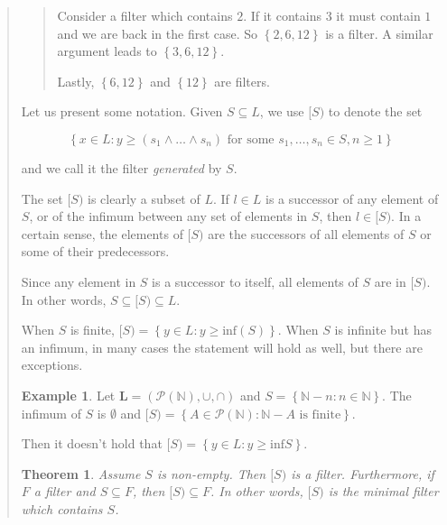 \documentclass[a4paper, 12pt]{article}
\newtheorem{theorem}{Theorem}
\theoremstyle{definition}
\theoremstyle{definition}
\newtheorem{example}{Example}
\theoremstyle{definition}
\begin{document}
\begin{quote}
\begin{quote}
Consider a filter which contains $2$. If it contains $3$ it must contain $1$
and we are back in the first case. So $\left\{ 2, 6, 12 \right\} $ is a filter.
A similar argument leads to $\left\{ 3, 6, 12 \right\} $.

Lastly, $\left\{ 6, 12 \right\} $ and $\left\{ 12 \right\} $ are filters.

\end{quote}
\normalsize

Let us present some notation. Given $S \subseteq L$, we use $[S)$ to 
denote the set 

\begin{equation*}
    \left\{ x \in L : y \geq (s_1 \land  \ldots \land s_n) \text{ for some } s_1, \ldots, s_n \in S, n \geq 1 \right\} 
\end{equation*}

and we call it the filter \textit{generated} by $S$.

The set $[S)$ is clearly a subset of $L$. If $l \in L$ is a successor of any
element of $S$, or of the infimum between any set of elements in $S$, then $l
\in [S)$. In a certain sense, the elements of $[S)$ are the successors of all
elements of $S$ or some of their predecessors.

Since any element in $S$ is a successor to itself, all elements of $S$ are in
$[S)$. In other words, $S \subseteq [S) \subseteq L$.

When $S$ is finite, $[S) = \left\{ y \in L : y \geq \text{inf}(S) \right\} $.
When $S$ is infinite but has an infimum, in many cases the statement will hold
as well, but there are exceptions.

\begin{example}
    Let $\textbf{L} = \left( \mathcal{P}(\mathbb{N}), \cup, \cap  \right) $ and 
    $S = \left\{ \mathbb{N} - n : n \in \mathbb{N} \right\} $. 
    The infimum of $S$ is $\emptyset$ and $[S) = \left\{ A \in
    \mathcal{P}(\mathbb{N}) : \mathbb{N} - A \text{ is finite}\right\} $.

    Then it doesn't hold that $[S) = \left\{ y \in L : y \geq \text{inf} S
    \right\} $.
\end{example}

\begin{theorem}
    Assume $S$ is non-empty. Then $[S)$ is a filter. Furthermore, if $F$ a
    filter and $S \subseteq F$, then $[S) \subseteq F$. In other words, $[S)$
    is the minimal filter which contains $S$.
\end{theorem}



\end{quote}
\end{document}
